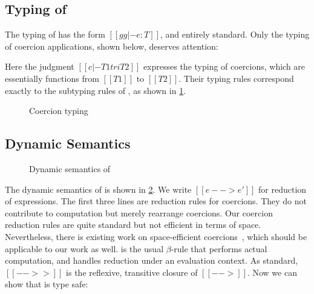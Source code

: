 

\subsection{Typing of \tname}

The typing of \tname has the form $[[gg |- e : T]]$, and entirely standard. Only the typing of coercion
applications, shown below, deserves attention:
\begin{mathpar}
\end{mathpar}
Here the judgment $[[c |- T1 tri T2]]$ expresses the typing of coercions, which
are essentially functions from $[[T1]]$ to $[[T2]]$. Their typing
rules correspond exactly to the subtyping rules of \namee, as
shown in \cref{fig:co}.

\begin{figure}[t]
  \centering
  \caption{Coercion typing}
  \label{fig:co}
\end{figure}


\subsection{Dynamic Semantics}

\begin{figure}[t]
  \centering
{}
  \caption{Dynamic semantics of \tname}
  \label{fig:coercion_red}
\end{figure}

The dynamic semantics of \tname is shown in \cref{fig:coercion_red}. We write
$[[e --> e']]$ for reduction of expressions. The first three lines are reduction
rules for coercions. They do not contribute to computation but merely rearrange
coercions. Our coercion reduction rules are quite standard but not efficient in
terms of space. Nevertheless, there is existing work on space-efficient
coercions~\citep{Siek_2015, herman2010space}, which should be applicable to our
work as well.  is the usual $\beta$-rule that performs actual
computation, and  handles reduction under an evaluation context. As
standard, $[[-->>]]$ is the reflexive, transitive closure of $[[-->]]$.
Now we can show that \tname is type safe:

